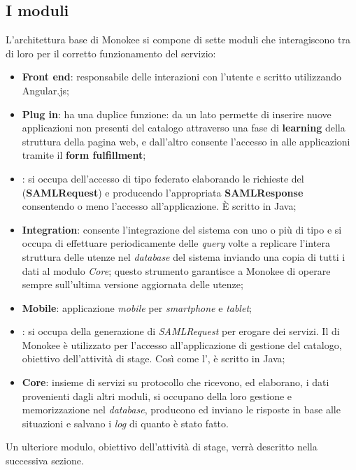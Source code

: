 \subsection{I moduli}
L'architettura base di Monokee si compone di sette moduli che interagiscono tra di loro per il corretto funzionamento del servizio:
\begin{itemize}
\item \textbf{Front end}: responsabile delle interazioni con l'utente e scritto utilizzando Angular.js;
\item \textbf{Plug in}: ha una duplice funzione: da un lato permette di inserire nuove applicazioni non presenti del catalogo attraverso una fase di \textbf{learning} della struttura della pagina web, e dall'altro consente l'accesso in  alle applicazioni tramite il \textbf{form fulfillment};
\item \textbf{}: si occupa dell'accesso di tipo federato  elaborando le richieste del  (\textbf{SAMLRequest}) e producendo l'appropriata \textbf{SAMLResponse} consentendo o meno l'accesso all'applicazione. È scritto in Java;
\item \textbf{ Integration}: consente l'integrazione del sistema con uno o più  di tipo  e si occupa di effettuare periodicamente delle \textit{query} volte a replicare l'intera struttura delle utenze nel \textit{database} del sistema inviando una copia di tutti i dati al modulo \textit{Core}; questo strumento garantisce a Monokee di operare sempre
sull'ultima versione aggiornata delle utenze;
\item \textbf{Mobile}: applicazione \textit{mobile} per \textit{smartphone} e \textit{tablet};
\item \textbf{}: si occupa della generazione di \textit{SAMLRequest} per erogare dei servizi. Il  di Monokee è utilizzato per l'accesso all'applicazione di gestione del catalogo, obiettivo dell'attività di stage. Così come l', è scritto in Java;
\item \textbf{Core}: insieme di servizi  su protocollo  che ricevono, ed elaborano, i dati provenienti dagli altri moduli, si occupano della loro gestione e memorizzazione nel \textit{database}, producono ed inviano le risposte in base alle situazioni e salvano i \textit{log} di quanto è stato fatto.
\end{itemize}
Un ulteriore modulo, obiettivo dell'attività di stage, verrà descritto nella successiva sezione.

